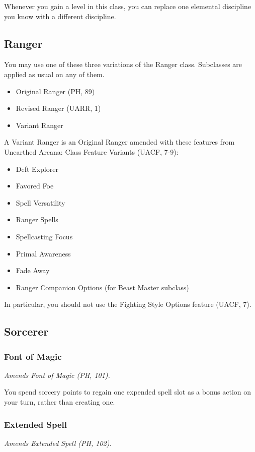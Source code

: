 \documentclass[letterpaper,twocolumn,openany,nodeprecatedcode]{dndbook}
\begin{document}
Whenever you gain a level in this class, you can replace one elemental discipline you know with a different discipline.

\subsection{Ranger}

You may use one of these three variations of the Ranger class. Subclasses are applied as usual on any of them.

\begin{itemize}
    \item Original Ranger (PH, 89)
    \item Revised Ranger (UARR, 1)
    \item Variant Ranger
\end{itemize}

\label{balance-class-ranger-variant}
A Variant Ranger is an Original Ranger amended with these features from Unearthed Arcana: Class Feature Variants (UACF, 7-9):

\begin{itemize}
    \item Deft Explorer
    \item Favored Foe
    \item Spell Versatility
    \item Ranger Spells
    \item Spellcasting Focus
    \item Primal Awareness
    \item Fade Away
    \item Ranger Companion Options (for Beast Master subclass)
\end{itemize}

In particular, you should not use the Fighting Style Options feature (UACF, 7).


\subsection{Sorcerer}

\subsubsection{Font of Magic}
\textit{Amends Font of Magic (PH, 101).}

You spend sorcery points to regain one expended spell slot as a bonus action on your turn, rather than creating one.

\subsubsection{Extended Spell}
\textit{Amends Extended Spell (PH, 102).}
\end{document}
